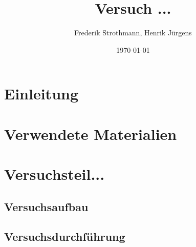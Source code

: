 \documentclass[12pt,a4paper]{article}
\title{Versuch ...\\}
\author{Frederik Strothmann, Henrik Jürgens}
\date{\today}
\begin{document}
\maketitle
\newpage
\tableofcontents
\newpage
\section{Einleitung}
\section{Verwendete Materialien}
\section{Versuchsteil...}
\subsection{Versuchsaufbau}
\subsection{Versuchsdurchführung}
\end{document}
